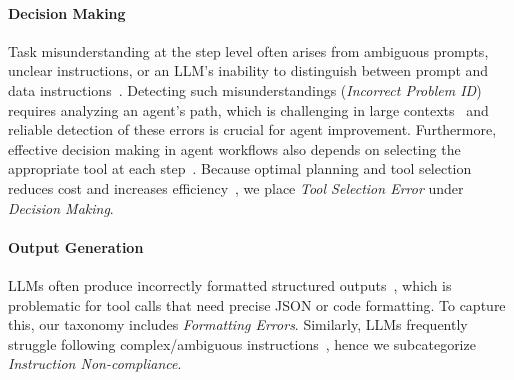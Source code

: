 \documentclass[11pt]{article}
\begin{document}
\paragraph{Decision Making}


Task misunderstanding at the step level often arises from ambiguous prompts, unclear instructions, or an LLM’s inability to distinguish between prompt and data instructions~\cite{zverev2024can}. Detecting such misunderstandings (\textit{Incorrect Problem ID}) requires analyzing an agent's path, which is challenging in large contexts~\cite{yuan2024back} and reliable detection of these errors is crucial for agent improvement. Furthermore, effective decision making in agent workflows also depends on selecting the appropriate tool at each step~\cite{qin2023toolllm}. Because optimal planning and tool selection reduces cost and increases efficiency~\cite{yehudai2025survey}, we place \textit{Tool Selection Error} under \textit{Decision Making}.

\paragraph{Output Generation} 
LLMs often produce incorrectly formatted structured outputs~\cite{shorten2024structuredrag, liu2024we}, which is problematic for tool calls that need precise JSON or code formatting. To capture this, our taxonomy includes \textit{Formatting Errors}. Similarly, LLMs frequently struggle following complex/ambiguous instructions~\cite{white2024livebench, heo2024llms}, hence we subcategorize \textit{Instruction Non-compliance}.
\end{document}
